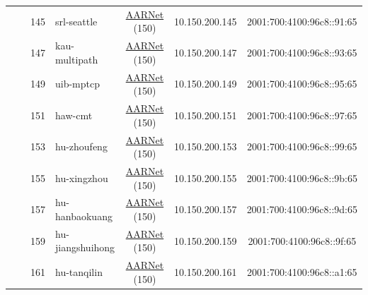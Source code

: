 \begin{small}
\begin{center}
\begin{longtable}{|c|c|c|c|c|c|c|c|}
  &  & \tiny{145} & \multicolumn{1}{|l|}{\tiny{srl-seattle}} & \multicolumn{2}{|c|}{\tiny{\href{https://www.aarnet.edu.au/}{AARNet} (150)}} & \tiny{10.150.200.145} & \tiny{2001:700:4100:96c8::91:65} \\* \cline{3-3}\cline{4-4}\cline{5-5}\cline{6-6}\cline{7-7}\cline{8-8}
  &  & \tiny{147} & \multicolumn{1}{|l|}{\tiny{kau-multipath}} & \multicolumn{2}{|c|}{\tiny{\href{https://www.aarnet.edu.au/}{AARNet} (150)}} & \tiny{10.150.200.147} & \tiny{2001:700:4100:96c8::93:65} \\* \cline{3-3}\cline{4-4}\cline{5-5}\cline{6-6}\cline{7-7}\cline{8-8}
  &  & \tiny{149} & \multicolumn{1}{|l|}{\tiny{uib-mptcp}} & \multicolumn{2}{|c|}{\tiny{\href{https://www.aarnet.edu.au/}{AARNet} (150)}} & \tiny{10.150.200.149} & \tiny{2001:700:4100:96c8::95:65} \\* \cline{3-3}\cline{4-4}\cline{5-5}\cline{6-6}\cline{7-7}\cline{8-8}
  &  & \tiny{151} & \multicolumn{1}{|l|}{\tiny{haw-cmt}} & \multicolumn{2}{|c|}{\tiny{\href{https://www.aarnet.edu.au/}{AARNet} (150)}} & \tiny{10.150.200.151} & \tiny{2001:700:4100:96c8::97:65} \\* \cline{3-3}\cline{4-4}\cline{5-5}\cline{6-6}\cline{7-7}\cline{8-8}
  &  & \tiny{153} & \multicolumn{1}{|l|}{\tiny{hu-zhoufeng}} & \multicolumn{2}{|c|}{\tiny{\href{https://www.aarnet.edu.au/}{AARNet} (150)}} & \tiny{10.150.200.153} & \tiny{2001:700:4100:96c8::99:65} \\* \cline{3-3}\cline{4-4}\cline{5-5}\cline{6-6}\cline{7-7}\cline{8-8}
  &  & \tiny{155} & \multicolumn{1}{|l|}{\tiny{hu-xingzhou}} & \multicolumn{2}{|c|}{\tiny{\href{https://www.aarnet.edu.au/}{AARNet} (150)}} & \tiny{10.150.200.155} & \tiny{2001:700:4100:96c8::9b:65} \\* \cline{3-3}\cline{4-4}\cline{5-5}\cline{6-6}\cline{7-7}\cline{8-8}
  &  & \tiny{157} & \multicolumn{1}{|l|}{\tiny{hu-hanbaokuang}} & \multicolumn{2}{|c|}{\tiny{\href{https://www.aarnet.edu.au/}{AARNet} (150)}} & \tiny{10.150.200.157} & \tiny{2001:700:4100:96c8::9d:65} \\* \cline{3-3}\cline{4-4}\cline{5-5}\cline{6-6}\cline{7-7}\cline{8-8}
  &  & \tiny{159} & \multicolumn{1}{|l|}{\tiny{hu-jiangshuihong}} & \multicolumn{2}{|c|}{\tiny{\href{https://www.aarnet.edu.au/}{AARNet} (150)}} & \tiny{10.150.200.159} & \tiny{2001:700:4100:96c8::9f:65} \\* \cline{3-3}\cline{4-4}\cline{5-5}\cline{6-6}\cline{7-7}\cline{8-8}
  &  & \tiny{161} & \multicolumn{1}{|l|}{\tiny{hu-tanqilin}} & \multicolumn{2}{|c|}{\tiny{\href{https://www.aarnet.edu.au/}{AARNet} (150)}} & \tiny{10.150.200.161} & \tiny{2001:700:4100:96c8::a1:65} \\* \cline{3-3}\cline{4-4}\cline{5-5}\cline{6-6}\cline{7-7}\cline{8-8}

\end{longtable}
\end{center}
\end{small}
